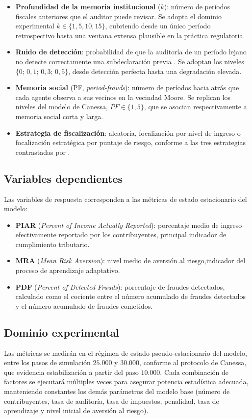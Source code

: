 \begin{itemize}
  \item \textbf{Profundidad de la memoria institucional} ($k$): número de períodos fiscales anteriores que el auditor puede revisar. Se adopta el dominio experimental $k \in \{1, 5, 10, 15\}$, cubriendo desde un único período retrospectivo hasta una ventana extensa plausible en la práctica regulatoria.
  \item \textbf{Ruido de detección}: probabilidad de que la auditoría de un período lejano no detecte correctamente una subdeclaración previa \parencite{debacker2018once}. Se adoptan los niveles $\{0;\, 0{,}1;\, 0{,}3;\, 0{,}5\}$, desde detección perfecta hasta una degradación elevada.
  \item \textbf{Memoria social} (PF, \textit{period-frauds}): número de períodos hacia atrás que cada agente observa a sus vecinos en la vecindad Moore. Se replican los niveles del modelo de Canessa, $PF \in \{1, 5\}$, que se asocian respectivamente a memoria social corta y larga.
  \item \textbf{Estrategia de fiscalización}: aleatoria, focalización por nivel de ingreso o focalización estratégica por puntaje de riesgo, conforme a las tres estrategias contrastadas por \textcite{canessa2025tax}.
\end{itemize}

\subsection{Variables dependientes}
\label{sec:vd}

Las variables de respuesta corresponden a las métricas de estado estacionario del modelo:

\begin{itemize}
  \item \textbf{PIAR} (\textit{Percent of Income Actually Reported}): porcentaje medio de ingreso efectivamente reportado por los contribuyentes, principal indicador de cumplimiento tributario.
  \item \textbf{MRA} (\textit{Mean Risk Aversion}): nivel medio de aversión al riesgo,indicador del proceso de aprendizaje adaptativo.
  \item \textbf{PDF} (\textit{Percent of Detected Frauds}): porcentaje de fraudes detectados, calculado como el cociente entre el número acumulado de fraudes detectados y el número acumulado de fraudes cometidos.
\end{itemize}

\subsection{Dominio experimental}
\label{sec:dominio}

Las métricas se medirán en el régimen de estado pseudo-estacionario del modelo, entre los pasos de simulación $25.000$ y $30.000$, conforme al protocolo de Canessa, que evidencia estabilización a partir del paso $10.000$. Cada combinación de factores se ejecutará múltiples veces para asegurar potencia estadística adecuada, manteniendo constantes los demás parámetros del modelo base (número de contribuyentes, tasa de auditoría, tasa de impuestos, penalidad, tasa de aprendizaje y nivel inicial de aversión al riesgo).